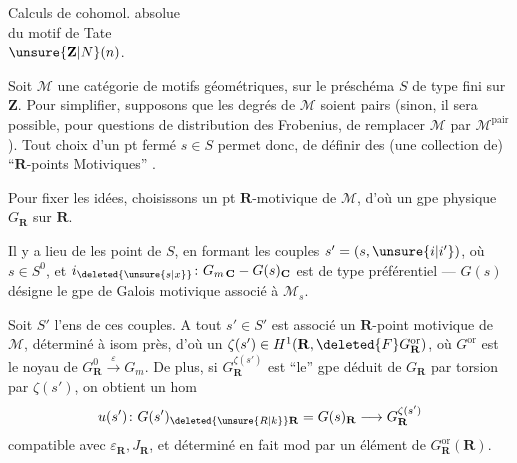 

\begin{center}
Calculs de cohomol. absolue\\
du motif de Tate\\
$\unsure{\mathbf Z|N}(n)$.
\end{center}


Soit $\mathcal M$ une catégorie de motifs géométriques,  sur le préschéma $S$ de type fini sur $\mathbf Z$. Pour simplifier, supposons que les degrés de $\mathcal M$ soient pairs (sinon, il sera possible, pour   questions de distribution des Frobenius, de remplacer $\mathcal M$ par $\mathcal M^{\mathrm{pair}}$). Tout choix d'un pt fermé $s\in S$ permet donc, de définir des (une collection de) ``$\mathbf R$-points Motiviques''  .

Pour fixer les idées, choisissons un pt $\mathbf R$-motivique de $\mathcal M$, d'où un gpe physique $G_{\mathbf R}$ sur $\mathbf R$.

Il y a lieu de   les point  de $S$, en formant les couples $s'=(s,\unsure{i|i'})$, où $s\in S^0$, et
$i_{\deleted{\unsure{s|x}}}\colon G_{m\,\mathbf C}-G(s)_{\mathbf C}$ est de type  préférentiel --- $G(s)$ désigne le gpe de Galois motivique associé à $\mathcal M_s$.

 Soit $S'$ l'ens de ces couples. A tout $s'\in S'$ est associé un $\mathbf R$-point motivique de $\mathcal M$,  déterminé à isom près, d'où un $\zeta(s')\in H^1(\mathbf R,\deleted{F}G_{\mathbf R}^{\mathrm{or}})$, où $G^{\mathrm{or}}$ est le noyau de $G_{\mathbf R}^0\xrightarrow{\varepsilon}G_m$. De plus, si $G_{\mathbf R}^{\zeta(s')}$ est ``le'' gpe déduit de $G_{\mathbf R}$ par torsion par $\zeta(s')$, on obtient un hom
\[
u(s')\colon G(s')_{\deleted{\unsure{R|k}}\mathbf R}=G(s)_{\mathbf R}\longrightarrow G_{\mathbf R}^{\zeta(s')}
\]
compatible avec $\varepsilon_{\mathbf R},J_{\mathbf R}$, et déterminé en fait mod    par un élément de $G_{\mathbf R}^{\mathrm{or}}(\mathbf R)$.

